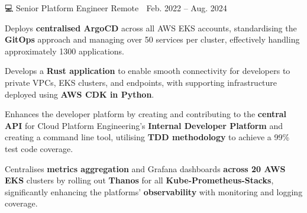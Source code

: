 {\begin{cventries}
        {💻 Senior Platform Engineer} %
        {Remote 📍} %
        {Feb. 2022 – Aug. 2024 📆} %
        {\begin{cvitems}
                \item {Deploys \textbf{centralised ArgoCD} across all AWS EKS accounts, standardising the \textbf{GitOps} approach and managing over 50 services per cluster, effectively handling approximately 1300 applications.}
                \item {Develops a \textbf{Rust application} to enable smooth connectivity for developers to private VPCs, EKS clusters, and endpoints, with supporting infrastructure deployed using \textbf{AWS CDK in Python}.}
                \item {Enhances the developer platform by creating and contributing to the \textbf{central API} for Cloud Platform Engineering’s \textbf{Internal Developer Platform} and creating a command line tool, utilising \textbf{TDD methodology} to achieve a 99\% test code coverage.}
                \item{Centralises \textbf{metrics aggregation} and Grafana dashboards \textbf{across 20 AWS EKS} clusters by rolling out \textbf{Thanos} for all \textbf{Kube-Prometheus-Stacks}, significantly enhancing the platforms’ \textbf{observability} with monitoring and logging coverage.}
                \\
                \newline
            \end{cvitems}
        }


\end{cventries}}
